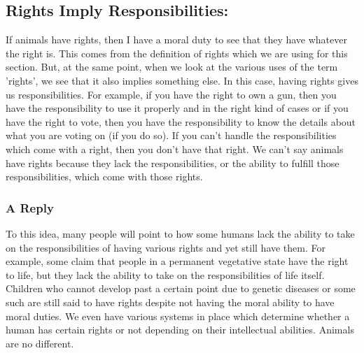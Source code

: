 \subsection{Rights Imply Responsibilities:}

If animals have rights, then I have a moral duty to see that they have whatever the right is. This comes from the definition of rights which we are using for this section. But, at the same point, when we look at the various uses of the term 'rights', we see that it also implies something else. In this case, having rights gives us responsibilities. For example, if you have the right to own a gun, then you have the responsibility to use it properly and in the right kind of cases or if you have the right to vote, then you have the responsibility to know the details about what you are voting on (if you do so). If you can't handle the responsibilities which come with a right, then you don't have that right.  We can’t say animals have rights because they lack the responsibilities, or the ability to fulfill those responsibilities, which come with those rights. 
\subsubsection{A Reply}

To this idea, many people will point to how some humans lack the ability to take on the responsibilities of having various rights and yet still have them. For example, some claim that people in a permanent vegetative state have the right to life, but they lack the ability to take on the responsibilities of life itself. Children who cannot develop past a certain point due to genetic diseases or some such are still said to have rights despite not having the moral ability to have moral duties. We even have various systems in place which determine whether a human has certain rights or not depending on their intellectual abilities. Animals are no different. 

